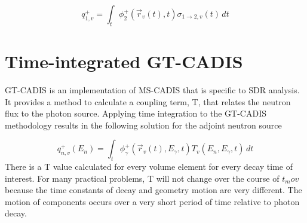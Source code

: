  \begin{equation}\label{eq:adj_src_1_avg}
	 q_{1,v}^{+} =
	 \int_{t}  \phi_{2}^{+}(\overrightarrow{r}_{v}(t), t)
	 \sigma_{1\rightarrow 2,v}(t)\, dt
 \end{equation}
 
\section{Time-integrated GT-CADIS}
GT-CADIS is an implementation of MS-CADIS that is specific to SDR analysis.  It
provides a method to calculate a coupling term, T, that relates the neutron
flux to the photon source.
Applying time integration to the GT-CADIS methodology results in the following
solution for the adjoint neutron source

 \begin{equation}\label{eq:adj_src_1_avg}
	 q_{n,v}^{+}(E_{n}) =
	 \int_{t}     \phi_{\gamma}^{+}(\overrightarrow{r}_{v}(t), E_{\gamma},t)
	 T_{v}(E_n, E_{\gamma}, t)\, dt
 \end{equation}
 There is a T value calculated for every volume element for every decay time of
 interest.  For many practical problems, T will not change over the course of
 $t_mov$  because the time constants of decay and geometry
 motion are very different.  The motion of components occurs over a very short
 period of time relative to photon decay.  

